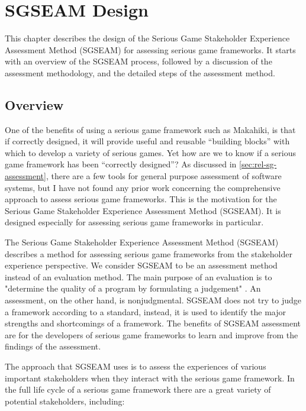 \chapter{SGSEAM Design}
\label{cha:sgseam-design}

This chapter describes the design of the Serious Game Stakeholder Experience 
Assessment Method (SGSEAM) for assessing serious game frameworks. It starts with an overview of the SGSEAM process, followed by a discussion of the assessment methodology, and the detailed steps of the assessment method.

\section{Overview}

One of the benefits of using a serious game framework such as Makahiki, is that if correctly designed, it will provide useful and reusable ``building blocks'' with which to develop a variety of serious games. Yet how are we to know if a serious game framework has been ``correctly designed''? As discussed in \autoref{sec:rel-sg-assessment}, there are a few tools for general purpose assessment of software systems, but I have not found any prior work concerning the comprehensive approach to assess serious game frameworks. This is the motivation for the Serious Game Stakeholder Experience 
Assessment Method (SGSEAM). It is designed especially for assessing serious game frameworks in particular.

The Serious Game Stakeholder Experience Assessment Method (SGSEAM) describes a method for 
assessing serious game frameworks from the stakeholder 
experience perspective.  We consider
SGSEAM to be an assessment method instead of an evaluation method. The main purpose of an
evaluation is to "determine the quality of a program by formulating a judgement"
\cite{hurteau2009legitimate}. An assessment, on the other hand, is nonjudgmental. SGSEAM does
not try to judge a framework according to a standard, instead, it is used to identify the major
strengths and shortcomings of a framework.
The benefits of SGSEAM assessment are for the developers of serious game frameworks 
to learn and improve from the findings of the assessment.

The approach that SGSEAM uses is to assess the experiences of various important stakeholders when
they interact with the serious game framework. In the full life cycle of a serious game framework
there are a great variety of potential stakeholders, including:

